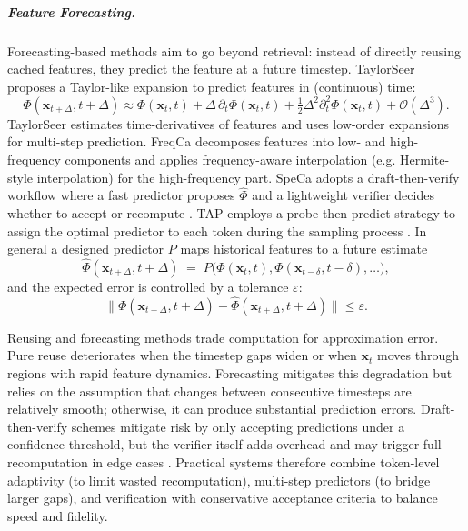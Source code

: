 \documentclass{llmxive}
\begin{document}
\subparagraph{Feature Forecasting.}
Forecasting-based methods aim to go beyond retrieval: instead of directly reusing cached features, they predict the feature at a future timestep. TaylorSeer proposes a Taylor-like expansion to predict features in (continuous) time:
\begin{equation}
\Phi(\mathbf{x}_{t+\Delta},t+\Delta) \approx \Phi(\mathbf{x}_t,t) + \Delta\,\partial_t\Phi(\mathbf{x}_t,t) + \tfrac{1}{2}\Delta^2\partial_t^2\Phi(\mathbf{x}_t,t) + \mathcal{O}(\Delta^3).
\label{eq:taylor}
\end{equation}
TaylorSeer estimates time-derivatives of features and uses low-order expansions for multi-step prediction.
FreqCa decomposes features into low- and high-frequency components and applies frequency-aware interpolation (e.g. Hermite-style interpolation) for the high-frequency part. SpeCa adopts a draft-then-verify workflow where a fast predictor proposes \(\hat{\Phi}\) and a lightweight verifier decides whether to accept or recompute \citep{liuReusingForecastingAccelerating2025,liu2025freqca,liu2025speca}. TAP employs a probe-then-predict strategy to assign the optimal predictor to each token during the sampling process \citep{zhu2026tap}.
In general a designed predictor \(P\) maps historical features to a future estimate
\begin{equation}
\hat{\Phi}(\mathbf{x}_{t+\Delta},t+\Delta) \;=\; P\big(\Phi(\mathbf{x}_{t},t), \Phi(\mathbf{x}_{t-\delta},t-\delta),\dots\big),
\label{eq:predictor}
\end{equation}
and the expected error is controlled by a tolerance \(\varepsilon\):
\[
\big\|\Phi(\mathbf{x}_{t+\Delta},t+\Delta) - \hat{\Phi}(\mathbf{x}_{t+\Delta},t+\Delta)\big\| \le \varepsilon.
\]

Reusing and forecasting methods trade computation for approximation error. Pure reuse deteriorates when the timestep gaps widen or when \(\mathbf{x}_t\) moves through regions with rapid feature dynamics. Forecasting mitigates this degradation but relies on the assumption that changes between consecutive timesteps are relatively smooth; otherwise, it can produce substantial prediction errors.
Draft-then-verify schemes mitigate risk by only accepting predictions under a confidence threshold, but the verifier itself adds overhead and may trigger full recomputation in edge cases \citep{liu2024timestep,chen2024delta-dit}. 
Practical systems therefore combine token-level adaptivity (to limit wasted recomputation), multi-step predictors (to bridge larger gaps), and verification with conservative acceptance criteria to balance speed and fidelity.
\end{document}
